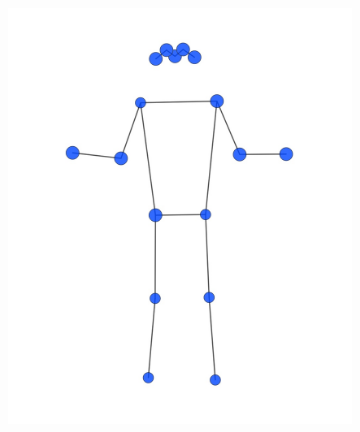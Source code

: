 \begin{figure}[h]
\centering
\begin{subfigure}[b]{0.4\textwidth}
	\centering
	\includegraphics[width=\textwidth]{./images/experiment/data_info/pose_markup_examples/change_percentage}
	\caption{}
	\label{fig:any_correction}
\end{subfigure}
\begin{subfigure}[b]{0.4\textwidth}
	\centering

\end{subfigure}
\end{figure}
